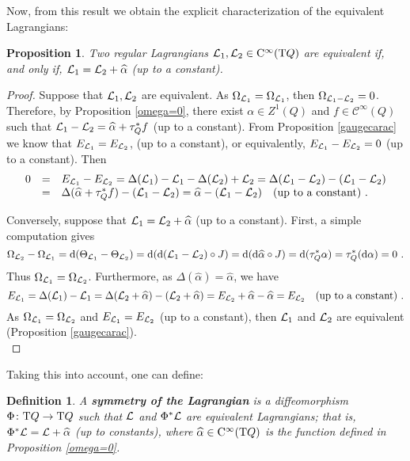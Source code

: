 \documentclass[12pt]{report}
\newtheorem{prop}[teor]{Proposition}
\newtheorem{definition}[teor]{Definition}
\def\qed{\ifvmode\removelastskip\fi
{\unskip\nobreak\hfil\penalty50\hbox{}\nobreak\hfil
\hbox{\vrule height1.2ex width1.2ex}\parfillskip=0pt
\finalhyphendemerits=0 \par\smallskip}}
\def\Lag{{\cal L}}
\def\d{{\rm d}}
\def\Tan{{\rm T}}
\def\Cinfty{{\rm C}^\infty}
\begin{document}
Now, from this result we obtain the explicit characterization of the equivalent Lagrangians:

\begin{prop}
\label{gaugeL}
Two regular Lagrangians $\Lag_1,\Lag_2\in\Cinfty (\Tan Q)$ are
equivalent if, and only if, $\Lag_1=\Lag_2+\widehat\alpha$  (up to a constant).
\end{prop}
\begin{proof}
Suppose that $\Lag_1,\Lag_2$ are equivalent.
As $\Omega_{\Lag_1}=\Omega_{\Lag_1}$, then
$\Omega_{\Lag_1-\Lag_2}=0$. Therefore, by Proposition \ref{omega=0}, 
there exist $\alpha\in Z^1(Q)$ and $f\in \mathcal{C}^\infty(Q)$ such that
$\Lag_1-\Lag_2=\widehat\alpha+\tau_Q^*f$ (up to a constant).
From Proposition \ref{gaugecarac} we know that 
$E_{\Lag_1}= E_{\Lag_2}$,  (up to a constant), or equivalently, 
$E_{\Lag_1}- E_{\Lag_2}=0$ (up to a constant). Then
$$
\begin{array}{lcl}
0&=&E_{\Lag_1}- E_{\Lag_2}=\Delta(\Lag_1)-\Lag_1
-\Delta(\Lag_2)+\Lag_2=\Delta(\Lag_1-\Lag_2)-(\Lag_1-\Lag_2)  \\ &=&
\Delta(\widehat\alpha+\tau_Q^*f)-(\Lag_1-\Lag_2) =
\widehat\alpha-(\Lag_1-\Lag_2)\quad \makebox{(up to a constant)}  \ .
 \end{array}
$$

Conversely, suppose that $\Lag_1=\Lag_2+\widehat\alpha$  (up to a  constant).
First, a simple computation gives
 $$
 \Omega_{\Lag_2}-\Omega_{\Lag_1}=
\d(\Theta_{\Lag_1}-\Theta_{\Lag_2})=\d(\d(\Lag_1-\Lag_2)\circ J)=
\d(\d\widehat\alpha\circ J)=\d(\tau_Q^*\alpha)=\tau_Q^*(\d\alpha)=0 \ .
$$
Thus $\Omega_{\Lag_1}=\Omega_{\Lag_2}$. Furthermore, 
as $\Delta(\widehat\alpha)=\widehat\alpha$, we have
 $$
 E_{\Lag_1}=\Delta(\Lag_1)-\Lag_1=
 \Delta(\Lag_2+\widehat\alpha)-(\Lag_2+\widehat\alpha)=
  E_{\Lag_2} + \widehat\alpha - \widehat\alpha= E_{\Lag_2}\quad
\makebox{\rm (up to a constant)} \ .
 $$
As $\Omega_{\Lag_1}=\Omega_{\Lag_2}$ and 
$ E_{\Lag_1}=E_{\Lag_2}$ (up to a constant), 
then $\Lag_1$ and $\Lag_2$ are equivalent (Proposition \ref{gaugecarac}).
\\ \qed \end{proof}

Taking this into account, one can define:

\begin{definition}
A \textbf{symmetry of the Lagrangian} is
a diffeomorphism $\Phi\colon\Tan Q\to\Tan Q$ such that
$\Lag$ and $\Phi^*\Lag$ are equivalent Lagrangians; that is,
$\Phi^*\Lag=\Lag+\widehat\alpha$ (up to constants),
where $\widehat\alpha\in\Cinfty (\Tan Q)$ is the function defined in Proposition \ref{omega=0}.
\end{definition}
\end{document}
